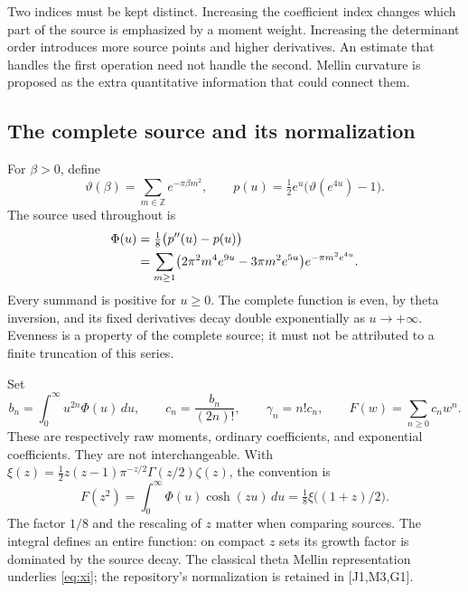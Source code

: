 \documentclass[11pt,letterpaper]{article}
\numberwithin{equation}{section}
\theoremstyle{remark}
\newcommand{\dd}{\,d}
\newcommand{\evid}[1]{\textsf{[#1]}}
\begin{document}
Two indices must be kept distinct. Increasing the coefficient index
changes which part of the source is emphasized by a moment weight.
Increasing the determinant order introduces more source points and
higher derivatives. An estimate that handles the first operation need
not handle the second. Mellin curvature is proposed as the extra
quantitative information that could connect them.

\subsection{The complete source and its normalization}

For $\beta>0$, define
\begin{equation}
 \vartheta(\beta)=\sum_{m\in\mathbb Z}e^{-\pi\beta m^2},
 \qquad p(u)=\tfrac12e^u\bigl(\vartheta(e^{4u})-1\bigr).
 \label{eq:primitive}
\end{equation}
The source used throughout is
\begin{align}
 \Phi(u)&=\tfrac18\bigl(p''(u)-p(u)\bigr) \notag\\
 &=\sum_{m\ge1}\bigl(2\pi^2m^4e^{9u}-3\pi m^2e^{5u}\bigr)
                 e^{-\pi m^2e^{4u}}. \label{eq:source}
\end{align}
Every summand is positive for $u\ge0$. The complete function is even,
by theta inversion, and its fixed derivatives decay double
exponentially as $u\to+\infty$. Evenness is a property of the complete
source; it must not be attributed to a finite truncation of this series.

Set
\begin{equation}
 b_n=\int_0^\infty u^{2n}\Phi(u)\dd u,\qquad
 c_n=\frac{b_n}{(2n)!},\qquad \gamma_n=n!c_n,
 \qquad F(w)=\sum_{n\ge0}c_nw^n. \label{eq:coeff}
\end{equation}
These are respectively raw moments, ordinary coefficients, and
exponential coefficients. They are not interchangeable. With
$\xi(z)=\tfrac12z(z-1)\pi^{-z/2}\Gamma(z/2)\zeta(z)$, the convention is
\begin{equation}
 F(z^2)=\int_0^\infty\Phi(u)\cosh(zu)\dd u
       =\tfrac18\xi\bigl((1+z)/2\bigr). \label{eq:xi}
\end{equation}
The factor $1/8$ and the rescaling of $z$ matter when comparing sources.
The integral defines an entire function: on compact $z$ sets its growth
factor is dominated by the source decay. The classical theta Mellin
representation underlies \eqref{eq:xi}; the repository's normalization is
retained in \evid{J1,M3,G1}.
\end{document}
